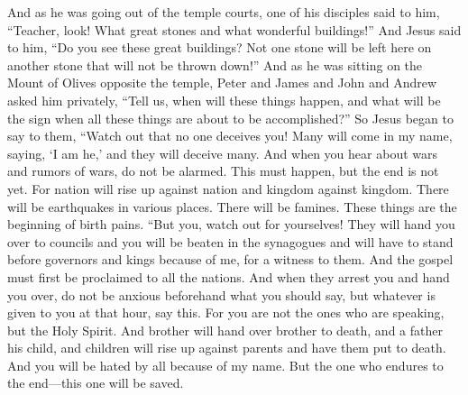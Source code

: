 \begin{biblechapter} %
 And as he was going out of the temple courts, one of his disciples said to him, “Teacher, look! What great stones and what wonderful buildings!”
\verse And Jesus said to him, “Do you see these great buildings? Not one stone will be left here on another stone that will not be thrown down!”
 And as he was sitting on the Mount of Olives opposite the temple, Peter and James and John and Andrew asked him privately,
\verse “Tell us, when will these things happen, and what will be the sign when all these things are about to be accomplished?”
\verse So Jesus began to say to them, “Watch out that no one deceives you!
\verse Many will come in my name, saying, ‘I am he,’ and they will deceive many.
\verse And when you hear about wars and rumors of wars, do not be alarmed. This must happen, but the end is not yet.
\verse For nation will rise up against nation and kingdom against kingdom. There will be earthquakes in various places. There will be famines. These things are the beginning of birth pains.
 “But you, watch out for yourselves! They will hand you over to councils and you will be beaten in the synagogues and will have to stand before governors and kings because of me, for a witness to them.
\verse And the gospel must first be proclaimed to all the nations.
\verse And when they arrest you and hand you over, do not be anxious beforehand what you should say, but whatever is given to you at that hour, say this. For you are not the ones who are speaking, but the Holy Spirit.
\verse And brother will hand over brother to death, and a father his child, and children will rise up against parents and have them put to death.
\verse And you will be hated by all because of my name. But the one who endures to the end—this one will be saved.

\end{biblechapter}
